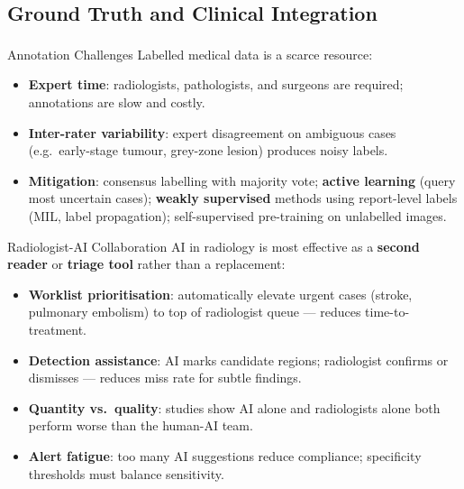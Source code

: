 \subsection{Ground Truth and Clinical Integration}

\begin{v3topic}{Annotation Challenges}
    Labelled medical data is a scarce resource\textsuperscript{\cite[][pp.~232--233]{challenArtificialIntelligenceBias2019}}:
    \begin{itemize}
        \item \textbf{Expert time}: radiologists, pathologists, and surgeons are required; annotations are slow and costly.
        \item \textbf{Inter-rater variability}: expert disagreement on ambiguous cases (e.g.\ early-stage tumour, grey-zone lesion) produces noisy labels.
        \item \textbf{Mitigation}: consensus labelling with majority vote; \textbf{active learning} (query most uncertain cases); \textbf{weakly supervised} methods using report-level labels (MIL, label propagation); self-supervised pre-training on unlabelled images.
    \end{itemize}

\end{v3topic}
\begin{v3topic}{Radiologist-AI Collaboration}
    AI in radiology is most effective as a \textbf{second reader} or \textbf{triage tool} rather than a replacement:
    \begin{itemize}
        \item \textbf{Worklist prioritisation}: automatically elevate urgent cases (stroke, pulmonary embolism) to top of radiologist queue — reduces time-to-treatment.
        \item \textbf{Detection assistance}: AI marks candidate regions; radiologist confirms or dismisses — reduces miss rate for subtle findings.
        \item \textbf{Quantity vs.\ quality}: studies show AI alone and radiologists alone both perform worse than the human-AI team.
        \item \textbf{Alert fatigue}: too many AI suggestions reduce compliance; specificity thresholds must balance sensitivity.
    \end{itemize}

\end{v3topic}
